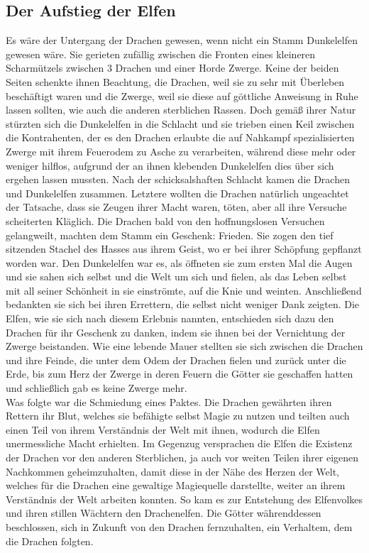 \documentclass[a4paper,12pt,oneside]{book}
\begin{document}
\subsection{Der Aufstieg der Elfen}
Es wäre der Untergang der Drachen gewesen, wenn nicht ein Stamm Dunkelelfen gewesen wäre. Sie gerieten zufällig zwischen die Fronten eines kleineren Scharmützels zwischen 3 Drachen und einer Horde Zwerge. Keine der beiden Seiten schenkte ihnen Beachtung, die Drachen, weil sie zu sehr mit Überleben beschäftigt waren und die Zwerge, weil sie diese auf göttliche Anweisung in Ruhe lassen sollten, wie auch die anderen sterblichen Rassen. Doch gemäß ihrer Natur stürzten sich die Dunkelelfen in die Schlacht und sie trieben einen Keil zwischen die Kontrahenten, der es den Drachen erlaubte die auf Nahkampf spezialisierten Zwerge mit ihrem Feuerodem zu Asche zu verarbeiten, während diese mehr oder weniger hilflos, aufgrund der an ihnen klebenden Dunkelelfen dies über sich ergehen lassen mussten. Nach der schicksalshaften Schlacht kamen die Drachen und Dunkelelfen zusammen. Letztere wollten die Drachen natürlich ungeachtet der Tatsache, dass sie Zeugen ihrer Macht waren, töten, aber all ihre Versuche scheiterten Kläglich. Die Drachen bald von den hoffnungslosen Versuchen gelangweilt, machten dem Stamm ein Geschenk: Frieden. Sie zogen den tief sitzenden Stachel des Hasses aus ihrem Geist, wo er bei ihrer Schöpfung gepflanzt worden war. Den Dunkelelfen war es, als öffneten sie zum ersten Mal die Augen und sie sahen sich selbst und die Welt um sich und fielen, als das Leben selbst mit all seiner Schönheit in sie einströmte, auf die Knie und weinten. Anschließend bedankten sie sich bei ihren Errettern, die selbst nicht weniger Dank zeigten. Die Elfen, wie sie sich nach diesem Erlebnis nannten, entschieden sich dazu den Drachen für ihr Geschenk zu danken, indem sie ihnen bei der Vernichtung der Zwerge beistanden. Wie eine lebende Mauer stellten sie sich zwischen die Drachen und ihre Feinde, die unter dem Odem der Drachen fielen und zurück unter die Erde, bis zum Herz der Zwerge in deren Feuern die Götter sie geschaffen hatten und schließlich gab es keine Zwerge mehr. 
\\Was folgte war die Schmiedung eines Paktes. Die Drachen gewährten ihren Rettern ihr Blut, welches sie befähigte selbst Magie zu nutzen und teilten auch einen Teil von ihrem Verständnis der Welt mit ihnen, wodurch die Elfen unermessliche Macht erhielten. Im Gegenzug versprachen die Elfen die Existenz der Drachen vor den anderen Sterblichen, ja auch vor weiten Teilen ihrer eigenen Nachkommen geheimzuhalten, damit diese in der Nähe des Herzen der Welt, welches für die Drachen eine gewaltige Magiequelle darstellte, weiter an ihrem Verständnis der Welt arbeiten konnten. So kam es zur Entstehung des Elfenvolkes und ihren stillen Wächtern den Drachenelfen. Die Götter währenddessen beschlossen, sich in Zukunft von den Drachen fernzuhalten, ein Verhaltem, dem die Drachen folgten.
\end{document}
